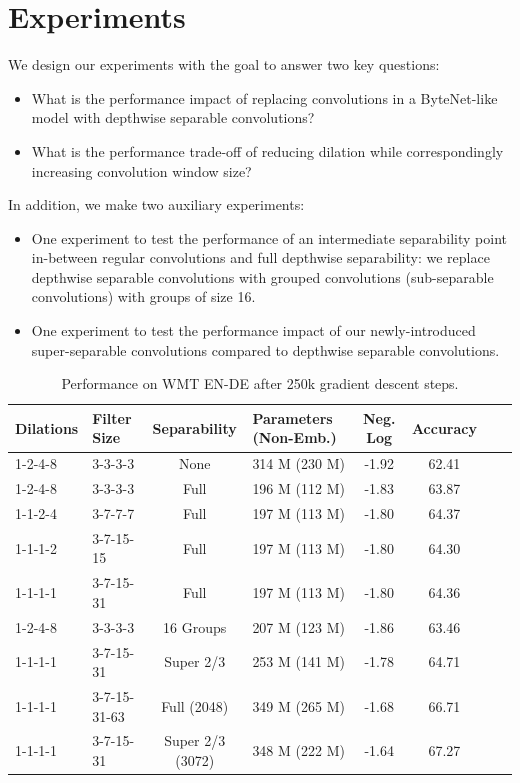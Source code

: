 \documentclass{article}
\begin{document}
\section{Experiments} \label{sec:exp}

We design our experiments with the goal to answer two key questions:

\begin{itemize}
    \item What is the performance impact of replacing convolutions in a ByteNet-like model with depthwise separable convolutions?
    \item What is the performance trade-off of reducing dilation while correspondingly increasing convolution window size?
\end{itemize}

In addition, we make two auxiliary experiments:

\begin{itemize}
    \item One experiment to test the performance of an intermediate separability point in-between regular convolutions and full depthwise separability: we replace depthwise separable convolutions with grouped convolutions (sub-separable convolutions) with groups of size 16. 
    \item One experiment to test the performance impact of our newly-introduced super-separable convolutions compared to depthwise separable convolutions.
\end{itemize}

\begin{table}
  \centering
  \begin{tabular}{llclcccc}
    \toprule
    Dilations & Filter Size & Separability & Parameters (Non-Emb.) & Neg. Log & Accuracy\\
    \midrule
    1-2-4-8 & 3-3-3-3    & None      & 314 M (230 M) & -1.92 & 62.41 \\
    1-2-4-8 & 3-3-3-3    & Full      & 196 M (112 M) & -1.83 & 63.87 \\
    1-1-2-4 & 3-7-7-7    & Full      & 197 M (113 M) & -1.80 & 64.37 \\
    1-1-1-2 & 3-7-15-15  & Full      & 197 M (113 M) & -1.80 & 64.30 \\
    1-1-1-1 & 3-7-15-31  & Full      & 197 M (113 M) & -1.80 & 64.36 \\
    1-2-4-8 & 3-3-3-3    & 16 Groups & 207 M (123 M) & -1.86 & 63.46 \\
    1-1-1-1 & 3-7-15-31  & Super 2/3 & 253 M (141 M) & -1.78 & 64.71 \\
    \midrule
    1-1-1-1 & 3-7-15-31-63 & Full (2048)      & 349 M (265 M) &  -1.68 & 66.71 \\
    1-1-1-1 & 3-7-15-31    & Super 2/3 (3072) & 348 M (222 M) & -1.64 & 67.27 \\
  \bottomrule
  \end{tabular}\\[4mm]
  \caption{Performance on WMT EN-DE after 250k gradient descent steps.}\label{tab:ablations}
  \label{table:acc_and_size}
\end{table}
\end{document}
